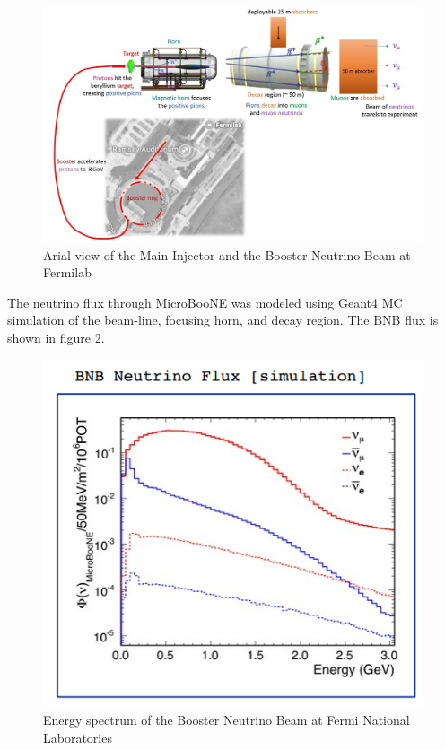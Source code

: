 \begin{figure}[htp!]
\centering
\includegraphics[width=.6\textwidth]{figs/BNB_layout.jpg}
\caption{Arial view of the Main Injector and the Booster Neutrino Beam at Fermilab}
\label{fig:bnb}
\end{figure}

The neutrino flux through MicroBooNE was modeled using Geant4 MC simulation of the beam-line, focusing horn, and decay region. The BNB flux is shown in figure \ref{fig:bnbflux}. 

\begin{figure}[htp!]
\centering
\includegraphics[width=.6\textwidth]{figs/bnbflux.png}
\caption{Energy spectrum of the Booster Neutrino Beam at Fermi National Laboratories}
\label{fig:bnbflux}
\end{figure}


